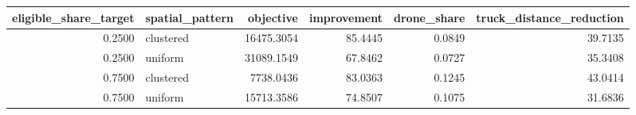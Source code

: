 \begin{tabular}{rlrrrr}
\toprule
eligible_share_target & spatial_pattern & objective & improvement & drone_share & truck_distance_reduction \\
\midrule
0.2500 & clustered & 16475.3054 & 85.4445 & 0.0849 & 39.7135 \\
0.2500 & uniform & 31089.1549 & 67.8462 & 0.0727 & 35.3408 \\
0.7500 & clustered & 7738.0436 & 83.0363 & 0.1245 & 43.0414 \\
0.7500 & uniform & 15713.3586 & 74.8507 & 0.1075 & 31.6836 \\
\bottomrule
\end{tabular}
